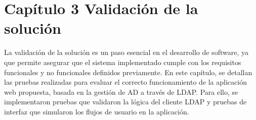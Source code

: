 \section{Capítulo 3 Validación de la solución}

La validación de la solución es un paso esencial en el desarrollo de software, ya que permite asegurar que el sistema implementado cumple con los requisitos funcionales y no funcionales definidos previamente. En este capítulo, se detallan las pruebas realizadas para evaluar el correcto funcionamiento de la aplicación web propuesta, basada en la gestión de AD a través de LDAP. Para ello, se implementaron pruebas que validaron la lógica del cliente LDAP y pruebas de interfaz que simularon los flujos de usuario en la aplicación.


